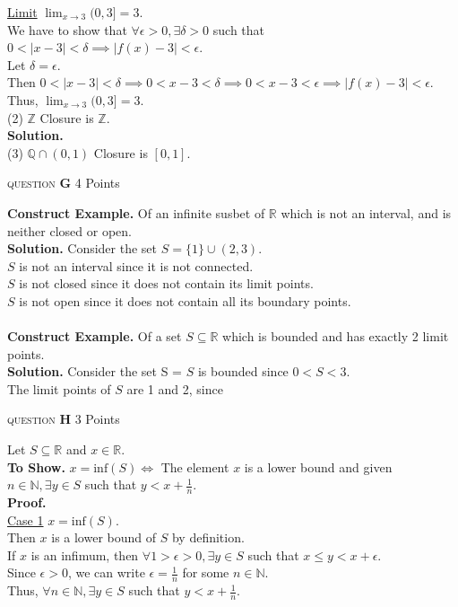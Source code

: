 \documentclass[11pt]{article}
\newcommand{\problem
}[2]{
\begin{mdframed}
    \textsc{question} \textbf{#1} \hfill #2
\end{mdframed}
}
\begin{document}
\noindent \underline{Limit}
$\lim_{x \to 3} (0, 3] = 3$.\\
We have to show that $\forall \epsilon > 0, \exists \delta > 0$ such that $0 < |x - 3| < \delta \implies |f(x) - 3| < \epsilon$.\\
Let $\delta = \epsilon$.\\
Then $0 < |x - 3| < \delta \implies 0 < x - 3 < \delta \implies 0 < x - 3 < \epsilon \implies |f(x) - 3| < \epsilon$.\\
Thus, $\lim_{x \to 3} (0, 3] = 3$.\\

(2) $\mathbb{Z}$ Closure is $\mathbb{Z}$.\\
\textbf{Solution.} \\

(3) $\mathbb{Q} \cap (0, 1)$ Closure is $[0, 1]$.\\



\problem{G}{4 Points}
\textbf{Construct Example. } Of an infinite susbet of $\mathbb{R}$ which is not an interval, and is neither closed or open.\\
\textbf{Solution.} Consider the set $S = \{1\} \cup (2, 3)$.\\
$S$ is not an interval since it is not connected.\\
$S$ is not closed since it does not contain its limit points.\\
$S$ is not open since it does not contain all its boundary points.\\
\\
\textbf{Construct Example. } Of a set $S \subseteq \mathbb{R}$ which is bounded and has exactly 2 limit points.\\
\textbf{Solution.} Consider the set S =
$S$ is bounded since $0 < S < 3$.\\
The limit points of $S$ are 1 and 2, since




\problem{H}{3 Points}
Let $S \subseteq \mathbb{R}$ and $x \in \mathbb{R}$.\\
\textbf{To Show. } $x = \text{inf}(S) \iff $ The element $x$ is a lower bound and given $n \in \mathbb{N}, \exists y \in S$ such that $y < x + \frac{1}{n}$.\\
\textbf{Proof.} \\
\underline{Case 1} $x = \text{inf}(S)$.\\
Then $x$ is a lower bound of $S$ by definition.\\
If $x$ is an infimum, then $\forall 1 > \epsilon > 0, \exists y \in S$ such that $x \leq y < x + \epsilon$.\\
Since $\epsilon > 0$, we can write $\epsilon = \frac{1}{n}$ for some $n \in \mathbb{N}$.\\
Thus, $\forall n \in \mathbb{N}, \exists y \in S$ such that $y < x + \frac{1}{n}$.\\
\end{document}

